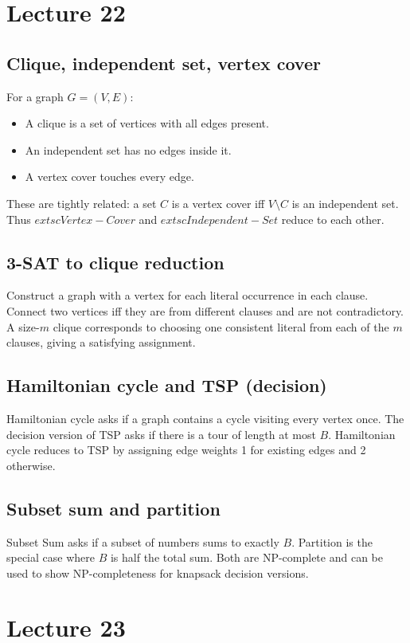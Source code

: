 \documentclass[11pt]{article}
\begin{document}
{{{{\section{Lecture 22}

\subsection*{Clique, independent set, vertex cover}
For a graph $G=(V,E)$:
\begin{itemize}
\item A clique is a set of vertices with all edges present.
\item An independent set has no edges inside it.
\item A vertex cover touches every edge.
\end{itemize}
These are tightly related: a set $C$ is a vertex cover iff $V\setminus C$ is an independent set.
Thus $	extsc{Vertex-Cover}$ and $	extsc{Independent-Set}$ reduce to each other.

\subsection*{3-SAT to clique reduction}
Construct a graph with a vertex for each literal occurrence in each clause. Connect two vertices
iff they are from different clauses and are not contradictory. A size-$m$ clique corresponds to
choosing one consistent literal from each of the $m$ clauses, giving a satisfying assignment.

\subsection*{Hamiltonian cycle and TSP (decision)}
Hamiltonian cycle asks if a graph contains a cycle visiting every vertex once. The decision
version of TSP asks if there is a tour of length at most $B$. Hamiltonian cycle reduces to TSP by
assigning edge weights 1 for existing edges and 2 otherwise.

\subsection*{Subset sum and partition}
Subset Sum asks if a subset of numbers sums to exactly $B$. Partition is the special case where
$B$ is half the total sum. Both are NP-complete and can be used to show NP-completeness for
knapsack decision versions.

\section{Lecture 23}

}}}}
\end{document}
